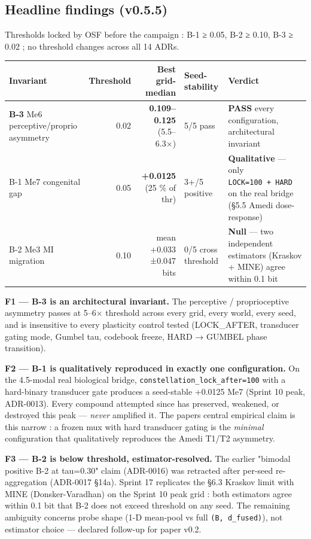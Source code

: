\documentclass[
]{article}
\newcounter{none} %
\begin{document}
\subsection{Headline findings (v0.5.5)}\label{headline-findings-v055}

Thresholds locked by OSF before the campaign : B-1 ≥ 0.05, B-2 ≥ 0.10,
B-3 ≥ 0.02 ; no threshold changes across all 14 ADRs.

{\def\LTcaptype{none} %
\begin{longtable}[]{@{}lrrll@{}}
\toprule\noalign{}
Invariant & Threshold & Best grid-median & Seed-stability & Verdict \\
\midrule\noalign{}
\endhead
\bottomrule\noalign{}
\endlastfoot
\textbf{B-3} Me6 perceptive/proprio asymmetry & 0.02 &
\textbf{0.109--0.125} (5.5--6.3×) & 5/5 pass & \textbf{PASS} every
configuration, architectural invariant \\
B-1 Me7 congenital gap & 0.05 & \textbf{+0.0125} (25 \% of thr) & 3+/5
positive & \textbf{Qualitative} --- only \texttt{LOCK=100\ +\ HARD} on
the real bridge (§5.5 Amedi dose-response) \\
B-2 Me3 MI migration & 0.10 & mean +0.033 ±0.047 bits & 0/5 cross
threshold & \textbf{Null} --- two independent estimators (Kraskov +
MINE) agree within 0.1 bit \\
\end{longtable}
}

\textbf{F1 --- B-3 is an architectural invariant.} The perceptive /
proprioceptive asymmetry passes at 5--6× threshold across every grid,
every world, every seed, and is insensitive to every plasticity control
tested (LOCK\_AFTER, transducer gating mode, Gumbel tau, codebook
freeze, HARD → GUMBEL phase transition).

\textbf{F2 --- B-1 is qualitatively reproduced in exactly one
configuration.} On the 4.5-modal real biological bridge,
\texttt{constellation\_lock\_after=100} with a hard-binary transducer
gate produces a seed-stable +0.0125 Me7 (Sprint 10 peak, ADR-0013).
Every compound attempted since has preserved, weakened, or destroyed
this peak --- \emph{never} amplified it. The paper\textquotesingle s
central empirical claim is this narrow : a frozen mux with hard
transducer gating is the \emph{minimal} configuration that qualitatively
reproduces the Amedi T1/T2 asymmetry.

\textbf{F3 --- B-2 is below threshold, estimator-resolved.} The earlier
"bimodal positive B-2 at tau=0.30" claim (ADR-0016) was retracted after
per-seed re-aggregation (ADR-0017 §14a). Sprint 17 replicates the §6.3
Kraskov limit with MINE (Donsker-Varadhan) on the Sprint 10 peak grid :
both estimators agree within 0.1 bit that B-2 does not exceed threshold
on any seed. The remaining ambiguity concerns probe shape (1-D mean-pool
vs full \texttt{(B,\ d\_fused)}), not estimator choice --- declared
follow-up for paper v0.2.
\end{document}
